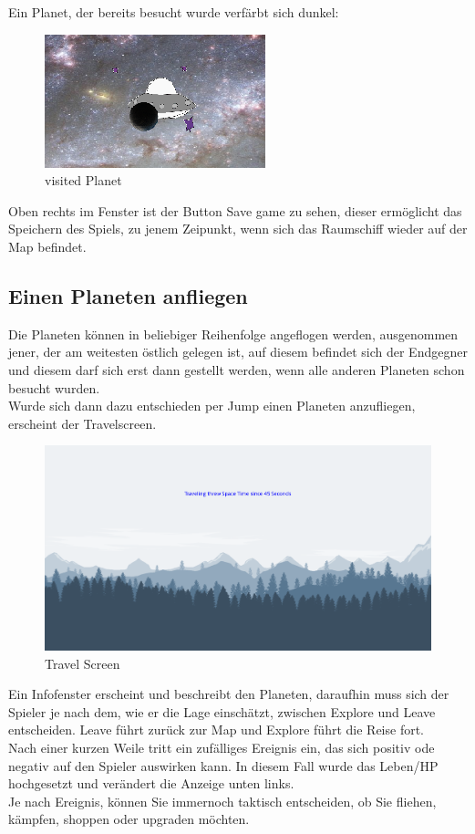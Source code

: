 \documentclass[fontsize=12pt,paper=a4,twoside]{scrartcl}
\begin{document}
Ein Planet, der bereits besucht wurde verfärbt sich dunkel:

\begin{figure}[htp]
	\centering
	\includegraphics[width=0.30\linewidth]{pics/visitedPlanet.png}
	\caption{visited Planet}
	\label{fig1}
\end{figure}

Oben rechts im Fenster ist der Button Save game zu sehen, dieser ermöglicht das Speichern des Spiels, zu jenem Zeipunkt, wenn sich das Raumschiff wieder auf der Map befindet.

\subsection{Einen Planeten anfliegen}

Die Planeten können in beliebiger Reihenfolge angeflogen werden, ausgenommen jener, der am weitesten östlich gelegen ist, auf diesem befindet sich der Endgegner und diesem darf sich erst dann gestellt werden, wenn alle anderen Planeten schon besucht wurden.\\
Wurde sich dann dazu entschieden per Jump einen Planeten anzufliegen, erscheint der Travelscreen.
\begin{figure}[htp]
	\centering
	\includegraphics[width=1.00\linewidth]{pics/travelScreen.png}
	\caption{Travel Screen}
	\label{fig1}
\end{figure}
Ein Infofenster erscheint und beschreibt den Planeten, daraufhin muss sich der Spieler je nach dem, wie er die Lage einschätzt, zwischen Explore und Leave entscheiden. Leave führt zurück zur Map und Explore führt die Reise fort.\\
Nach einer kurzen Weile tritt ein zufälliges Ereignis ein, das sich positiv ode negativ auf den Spieler auswirken kann. In diesem Fall wurde das Leben/HP hochgesetzt und verändert die Anzeige unten links.\\
Je nach Ereignis, können Sie immernoch taktisch entscheiden, ob Sie fliehen, kämpfen, shoppen oder upgraden möchten.
\end{document}
